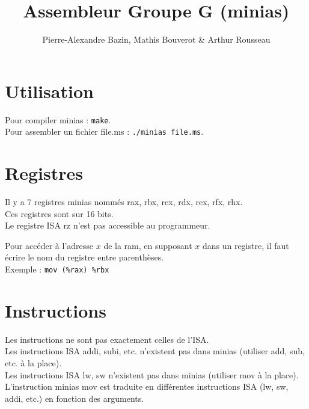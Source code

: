 \documentclass[a4paper]{article}
\title{Assembleur Groupe G (minias)}
\author{Pierre-Alexandre Bazin, Mathis Bouverot \& Arthur Rousseau}
\date{}
\begin{document}
    \maketitle
    \section{Utilisation}
    Pour compiler minias : \texttt{make}.\\
    Pour assembler un fichier file.ms : \texttt{./minias file.ms}.

    \section{Registres}
    Il y a 7 registres minias nommés rax, rbx, rcx, rdx, rex, rfx, rhx.\\
    Ces registres sont sur 16 bits.\\
    Le registre ISA rz n'est pas accessible au programmeur.

    Pour accéder à l'adresse $x$ de la ram, en supposant $x$ dans un registre, 
    il faut écrire le nom du registre entre parenthèses.\\
    Exemple : \texttt{mov (\%rax) \%rbx}
    
    \section{Instructions}
    Les instructions ne sont pas exactement celles de l'ISA.\\
    Les instructions ISA addi, subi, etc. n'existent pas dans minias (utiliser add, sub, etc. à la place).\\ 
    Les instructions ISA lw, sw n'existent pas dans minias (utiliser mov à la place).\\
    L'instruction minias mov est traduite en différentes instructions ISA (lw, sw, addi, etc.) en fonction des arguments.
\end{document}
